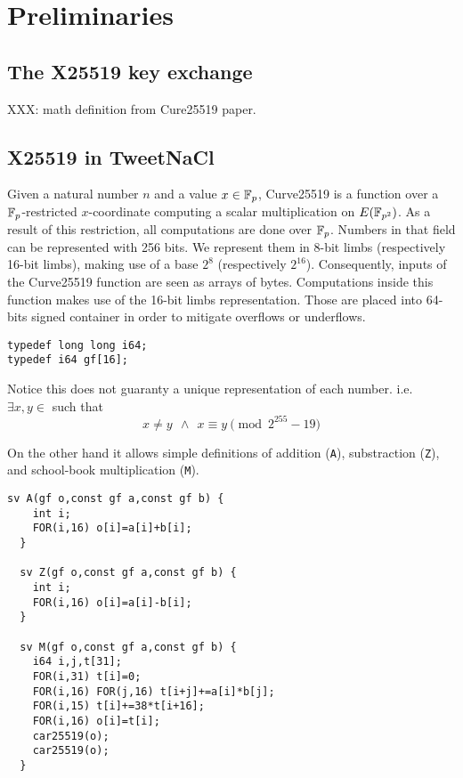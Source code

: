\section{Preliminaries}
\label{preliminaries}
\subsection{The X25519 key exchange}


XXX: math definition from Cure25519 paper.

\subsection{X25519 in TweetNaCl}




Given a natural number $n$ and a value $x \in \mathbb{F}_{p}$, Curve25519 is a function over a $\mathbb{F}_{p}$-restricted
$x$-coordinate computing a scalar multiplication on $E(\mathbb{F}_{p^2})$.
As a result of this restriction, all computations are done over $\mathbb{F}_{p}$.
Numbers in that field can be represented with 256 bits.
We represent them in 8-bit limbs (respectively 16-bit limbs),
making use of a base $2^8$ (respectively $2^{16}$).
Consequently, inputs of the Curve25519 function are seen as arrays of bytes.
Computations inside this function makes use of the 16-bit limbs representation.
Those are placed into 64-bits signed container in order to mitigate overflows or underflows.
\begin{lstlisting}[language=Ctweetnacl]
typedef long long i64;
typedef i64 gf[16];
\end{lstlisting}
Notice this does not guaranty a unique representation of each number. i.e.\\
$\exists x,y \in$  such that
\vspace{-0.25cm}
  $$x \neq y\ \ \land\ \ x \equiv y \pmod{2^{255}-19}$$

  On the other hand it allows simple definitions of addition (\texttt{A}),
  substraction (\texttt{Z}), and school-book multiplication (\texttt{M}).
  \begin{lstlisting}[language=Ctweetnacl]
  sv A(gf o,const gf a,const gf b) {
    int i;
    FOR(i,16) o[i]=a[i]+b[i];
  }

  sv Z(gf o,const gf a,const gf b) {
    int i;
    FOR(i,16) o[i]=a[i]-b[i];
  }

  sv M(gf o,const gf a,const gf b) {
    i64 i,j,t[31];
    FOR(i,31) t[i]=0;
    FOR(i,16) FOR(j,16) t[i+j]+=a[i]*b[j];
    FOR(i,15) t[i]+=38*t[i+16];
    FOR(i,16) o[i]=t[i];
    car25519(o);
    car25519(o);
  }
  \end{lstlisting}


